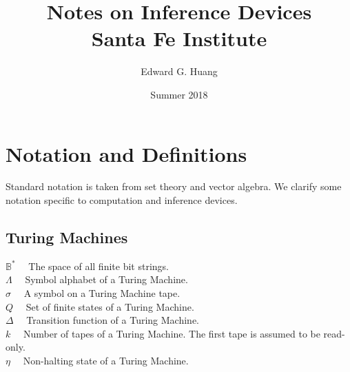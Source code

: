 \documentclass[11pt]{article}
\title{
  Notes on Inference Devices \\
  \large Santa Fe Institute}
\author{Edward G. Huang}
\date{Summer 2018}
\newcommand{\B}{\mathbb{B}}
\begin{document}
\maketitle 

\section{Notation and Definitions} 

Standard notation is taken from set theory and vector algebra. We clarify some notation specific to computation and inference devices. \\


\subsection{Turing Machines} 

$ \B^{*} \quad $ The space of all finite bit strings. \\
$ \Lambda \quad $ Symbol alphabet of a Turing Machine. \\
$ \sigma \quad $ A symbol on a Turing Machine tape. \\
$ Q \quad $ Set of finite states of a Turing Machine. \\
$ \Delta \quad $ Transition function of a Turing Machine. \\
$ k \quad $ Number of tapes of a Turing Machine. The first tape is assumed to be read-only. \\
$ \eta \quad $ Non-halting state of a Turing Machine. \\


\end{document}
